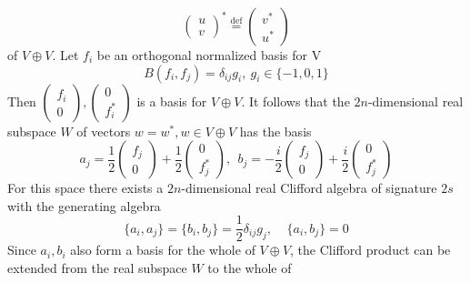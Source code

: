 \documentclass[a4paper,a4paper]{article}
\begin{document}
\begin{equation} 
\left( \begin{array}{c}u\\v \end{array} \right)^{\ast }
\stackrel{\mathrm{def}}{=} \left( \begin{array}{c}v^{\ast }\\u^{\ast }
\end{array} \right)
\label{b3} 
\end{equation}
of $V\oplus V$. Let $f_{i}$ be an orthogonal normalized basis for V
\begin{equation} 
B(f_{i},f_{j}) = \delta _{ij}g_{i}, \  g_{i} \in \{-1,0,1 \}
\label{b4} 
\end{equation}
Then $( \begin{array}{c}f_{i}\\0 \end{array} ) , (
\begin{array}{c}0\\f_{i}^{\ast }
\end{array} )$ is a basis for $V\oplus V$. It follows that the $2n$-dimensional
real subspace $W$ of  vectors $w = w^{\ast }, w \in  V\oplus V $ has the basis
\begin{equation} 
a_{j} = \frac{1}{2} \left( \begin{array}{c}f_{j}\\0 \end{array} \right)+
\frac{1}{2} \left( \begin{array}{c}0\\f_{j}^{\ast } \end{array} \right), \ \    
b_{j} = -\frac{i}{2} \left( \begin{array}{c}f_{j}\\0 \end{array} \right)+
\frac{i}{2} \left( \begin{array}{c}0\\f_{j}^{\ast } \end{array} \right) 
\label{b5} 
\end{equation}
For this space there exists a $2n$-dimensional real Clifford algebra of
signature $2s$ with the generating algebra
\begin{equation} 
\{a_{i},a_{j}\}=\{b_{i},b_{j}\}=\frac{1}{2}\delta _{ij}g_{j}, \ \ \ \ \
\{a_{i},b_{j}\}=0
\label{b6}
\end{equation}
Since $a_{i},b_{i}$ also form a basis for the whole of $V\oplus V$, the
Clifford product can be extended from the real subspace $W$ to the whole of
\end{document}
